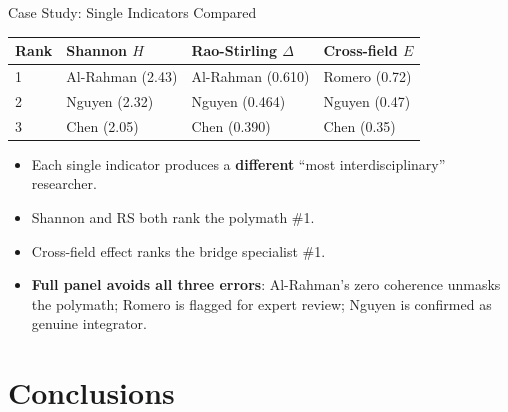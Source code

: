 \documentclass[aspectratio=169,10pt]{beamer}
\begin{document}
\begin{frame}{Case Study: Single Indicators Compared}
\begin{table}
\centering\small
\begin{tabular}{@{}l l l l@{}}
\toprule
\textbf{Rank} & \textbf{Shannon $H$} & \textbf{Rao-Stirling $\Delta$}
  & \textbf{Cross-field $E$} \\
\midrule
1 & Al-Rahman (2.43) & Al-Rahman (0.610) & Romero (0.72) \\
2 & Nguyen (2.32) & Nguyen (0.464) & Nguyen (0.47) \\
3 & Chen (2.05) & Chen (0.390) & Chen (0.35) \\
\bottomrule
\end{tabular}
\end{table}
\bigskip
\begin{itemize}
  \item Each single indicator produces a \textbf{different} ``most interdisciplinary''
        researcher.
  \item Shannon and RS both rank the polymath \#1.
  \item Cross-field effect ranks the bridge specialist \#1.
  \item \textbf{Full panel avoids all three errors}:
        Al-Rahman's zero coherence unmasks the polymath;
        Romero is flagged for expert review;
        Nguyen is confirmed as genuine integrator.
\end{itemize}
\end{frame}

\section{Conclusions}
\end{document}
